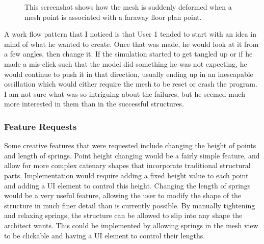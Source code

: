 \documentclass{thesis}
\begin{document}
\begin{figure}
\caption[Snapping]{This screenshot shows how the mesh is suddenly deformed when a mesh point is associated with a faraway
floor plan point.}
\label{fig:snapping}
\end{figure}

A work flow pattern that I noticed is that User 1 tended to start with an idea in mind of what he wanted to create.  Once that was made,
he would look at it from a few angles, then change it.  If the simulation started to get tangled up or if he made a mis-click
such that the model did something he was not expecting, he would continue to push it in that direction, usually ending up in an
inescapable oscillation which would either require the mesh to be reset or crash the program.  I am not sure what was so intriguing
about the failures, but he seemed much more interested in them than in the successful structures.

\subsubsection{Feature Requests}
Some creative features that were requested include changing the height of points and length of springs.  Point height changing
would be a fairly simple feature, and allow for more complex catenary shapes that incorporate traditional structural parts.
Implementation would require adding a fixed height value to each point and adding a UI element to control this height.
Changing the length of springs would be a very useful feature, allowing the user to modify the shape of the structure in much
finer detail than is currently possible.  By manually tightening and relaxing springs, the structure can be allowed to slip into
any shape the architect wants.  This could be implemented by allowing springs in the mesh view to be clickable and having a UI
element to control their lengths.
\end{document}

